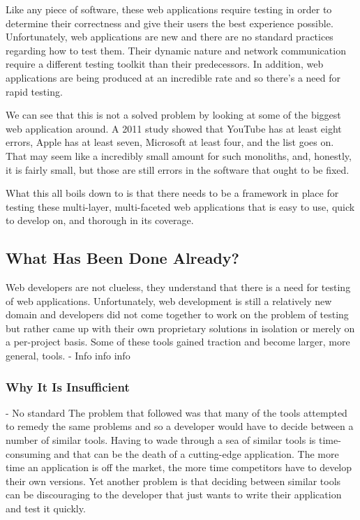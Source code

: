 \documentclass[11pt]{article}
\begin{document}
Like any piece of software, these web applications require testing in order to determine their correctness and give their users the best experience possible. Unfortunately, web applications are new and there are no standard practices regarding how to test them. Their dynamic nature and network communication require a different testing toolkit than their predecessors. In addition, web applications are being produced at an incredible rate and so there's a need for rapid testing.

We can see that this is not a solved problem by looking at some of the biggest web application around. A 2011 study showed that YouTube has at least eight errors, Apple has at least seven, Microsoft at least four, and the list goes on. \cite{ErrorsInTheWild} That may seem like a incredibly small amount for such monoliths, and, honestly, it is fairly small, but those are still errors in the software that ought to be fixed.

What this all boils down to is that there needs to be a framework in place for testing these multi-layer, multi-faceted web applications that is easy to use, quick to develop on, and thorough in its coverage.

\subsection{What Has Been Done Already?}
Web developers are not clueless, they understand that there is a need for testing of web applications. Unfortunately, web development is still a relatively new domain and developers did not come together to work on the problem of testing but rather came up with their own proprietary solutions in isolation or merely on a per-project basis. Some of these tools gained traction and become larger, more general, tools. 
- Info info info

\subsubsection{Why It Is Insufficient}
- No standard
The problem that followed was that many of the tools attempted to remedy the same problems and so a developer would have to decide between a number of similar tools. Having to wade through a sea of similar tools is time-consuming and that can be the death of a cutting-edge application. The more time an application is off the market, the more time competitors have to develop their own versions. Yet another problem is that deciding between similar tools can be discouraging to the developer that just wants to write their application and test it quickly.
\end{document}
